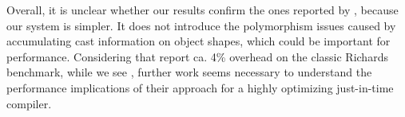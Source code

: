 Overall, it is unclear whether our results confirm the ones
reported by \citet{Richards2017},
because our system is simpler.
It does not introduce the polymorphism
issues caused by accumulating cast information on object shapes,
which could be important for performance.
Considering that \citeauthor{Richards2017} report ca. 4\% overhead
on the classic Richards benchmark, while we see \OverheadRichardsP,
further work seems necessary to understand the performance implications of
their approach for a highly optimizing just-in-time compiler.

%




